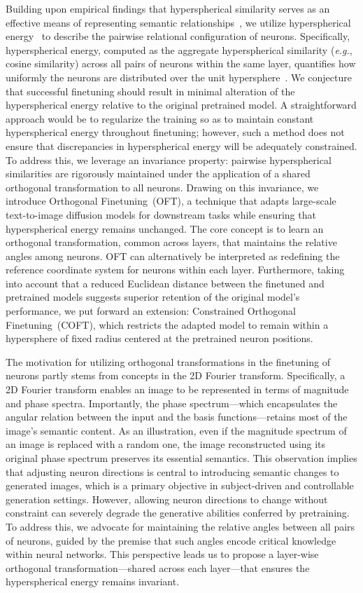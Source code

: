 Building upon empirical findings that hyperspherical similarity serves as an effective means of representing semantic relationships~\cite{liu2017deep,liu2018decoupled,chen2020angular}, we utilize hyperspherical energy~\cite{liu2018learning} to describe the pairwise relational configuration of neurons. Specifically, hyperspherical energy, computed as the aggregate hyperspherical similarity (\emph{e.g.}, cosine similarity) across all pairs of neurons within the same layer, quantifies how uniformly the neurons are distributed over the unit hypersphere~\cite{liu2021learning}. We conjecture that successful finetuning should result in minimal alteration of the hyperspherical energy relative to the original pretrained model. A straightforward approach would be to regularize the training so as to maintain constant hyperspherical energy throughout finetuning; however, such a method does not ensure that discrepancies in hyperspherical energy will be adequately constrained. To address this, we leverage an invariance property: pairwise hyperspherical similarities are rigorously maintained under the application of a shared orthogonal transformation to all neurons. Drawing on this invariance, we introduce Orthogonal Finetuning~(OFT), a technique that adapts large-scale text-to-image diffusion models for downstream tasks while ensuring that hyperspherical energy remains unchanged. The core concept is to learn an orthogonal transformation, common across layers, that maintains the relative angles among neurons. OFT can alternatively be interpreted as redefining the reference coordinate system for neurons within each layer. Furthermore, taking into account that a reduced Euclidean distance between the finetuned and pretrained models suggests superior retention of the original model's performance, we put forward an extension: Constrained Orthogonal Finetuning~(COFT), which restricts the adapted model to remain within a hypersphere of fixed radius centered at the pretrained neuron positions.

The motivation for utilizing orthogonal transformations in the finetuning of neurons partly stems from concepts in the 2D Fourier transform. Specifically, a 2D Fourier transform enables an image to be represented in terms of magnitude and phase spectra. Importantly, the phase spectrum—which encapsulates the angular relation between the input and the basis functions—retains most of the image's semantic content. As an illustration, even if the magnitude spectrum of an image is replaced with a random one, the image reconstructed using its original phase spectrum preserves its essential semantics. This observation implies that adjusting neuron directions is central to introducing semantic changes to generated images, which is a primary objective in subject-driven and controllable generation settings. However, allowing neuron directions to change without constraint can severely degrade the generative abilities conferred by pretraining. To address this, we advocate for maintaining the relative angles between all pairs of neurons, guided by the premise that such angles encode critical knowledge within neural networks. This perspective leads us to propose a layer-wise orthogonal transformation—shared across each layer—that ensures the hyperspherical energy remains invariant.

